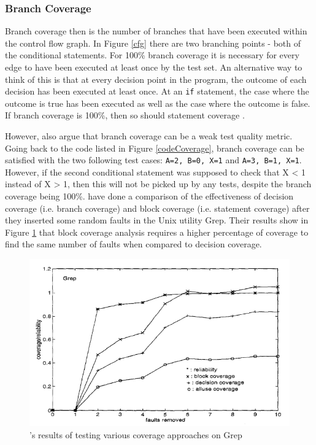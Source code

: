 \subsubsection{Branch Coverage}

Branch coverage then is the number of branches that have been executed within the control flow graph. In Figure \ref{cfg} there are two branching points - both of the conditional statements. For 100\% branch coverage it is necessary for every edge to have been executed at least once by the test set. An alternative way to think of this is that at every decision point in the program, the outcome of each decision has been executed at least once. At an \verb+if+ statement, the case where the outcome is true has been executed as well as the case where the outcome is false. If branch coverage is 100\%, then so should statement coverage \citep{Myers:2004:AST:983238}.

However, \citet{Myers:2004:AST:983238} also argue that branch coverage can be a weak test quality metric. Going back to the code listed in Figure \ref{codeCoverage}, branch coverage can be satisfied with the two following test cases: \verb+A=2, B=0, X=1+ and \verb+A=3, B=1, X=1+. However, if the second conditional statement was supposed to check that X < 1 instead of X > 1, then this will not be picked up by any tests, despite the branch coverage being 100\%. \citet{497650} have done a comparison of the effectiveness of decision coverage (i.e. branch coverage) and block coverage (i.e. statement coverage) after they inserted some random faults in the Unix utility Grep. Their results show in Figure \ref{coverageReliability} that block coverage analysis requires a higher percentage of coverage to find the same number of faults when compared to decision coverage.

\begin{figure}
	\begin{center}
		\includegraphics[width=5in]{figures/coverage_reliability.png}
	\end{center}
\caption{\citet{497650}'s results of testing various coverage approaches on Grep}
\label{coverageReliability}
\end{figure}

